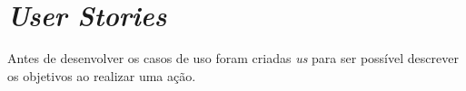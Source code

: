 \section{\textit{User Stories}}
Antes de desenvolver os casos de uso foram criadas \textit{\acrfull{us}} para ser possível descrever os objetivos ao realizar uma ação.

